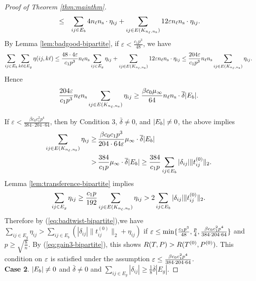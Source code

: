 \begin{proof}[Proof of Theorem \ref{thm:mainthm}]
\begin{eqnarray*}
	& \le & \sum_{ij\in E_{b}}4 n_\ell n_\text{s}\cdot\eta_{ij}+\sum_{ij\in E(K_{n_\ell, n_\text{s}})}12 \varepsilon n_\ell n_\text{s} \cdot\eta_{ij}.
\end{eqnarray*}
By Lemma \ref{lem:badgood-bipartite}, if $\varepsilon < \frac{c_1p^3}{48}$, we have
\[
	\sum_{ij\in E_{b}}\sum_{k\ell\in E_{g}}\eta(ij,k\ell)
	\le\frac{48 \cdot 4\varepsilon}{c_{1}p^{3}}n_\ell n_\text{s}\sum_{ij\in E_{g}}\eta_{ij}+\sum_{ij\in E(K_{n_\ell, n_\text{s}})} 12 \varepsilon n_\ell n_\text{s}\cdot\eta_{ij}
	\le\frac{204 \varepsilon}{c_{1}p^{3}}n_\ell n_\text{s}\sum_{ij\in E(K_{n_\ell, n_\text{s}})}\eta_{ij}.
\]
Hence
\[
	\frac{204\varepsilon}{c_{1}p^{3}}n_\ell n_\text{s}\sum_{ij\in E(K_{n_\ell, n_\text{s}})}\eta_{ij}\ge\frac{\beta c_{0}\mu_{\infty}}{64} n_\ell n_\text{s} \cdot\overline{\delta}|E_{b}|.
\]

If $\varepsilon< \frac{\beta c_0 c_1^2 p^4}{384\cdot 204 \cdot 64}$, then by Condition 3,
 $\bar{\delta} \neq 0$, and $|E_b| \neq 0$, the above implies 
\begin{align*}
	\sum_{ij\in E(K_{n_\ell, n_\text{s}})}\eta_{ij}
	\ge&\, \frac{\beta c_{0}c_{1}p^{3}}{204 \cdot 64 \varepsilon}\mu_{\infty} \cdot\overline{\delta}|E_{b}| \\
	>&\, \frac{384}{c_{1}p}\mu_{\infty}\cdot\overline{\delta}|E_{b}|
	\ge \frac{384}{c_{1}p}\sum_{ij\in E_{b}}|\delta_{ij}|\|t_{ij}^{(0)}\|_2.
\end{align*}
Lemma \ref{lem:transference-bipartite} implies 
\[
	\sum_{ij\in E_{g}}\eta_{ij}
	\ge \frac{c_{1}p}{192}\sum_{ij\in E(K_{n_\ell, n_\text{s}})}\eta_{ij}
	> 2\sum_{ij\in E_{b}}|\delta_{ij}|\|t_{ij}^{(0)}\|_2.
\]
Therefore by (\ref{eq:badtwist-bipartite}),we have $\sum_{ij\in E_{g}}\eta_{ij}>\sum_{ij\in E_{b}}(|\delta_{ij}|\|t_{ij}^{(0)}\|_2+\eta_{ij})$ if $\varepsilon \le \min\{\frac{c_1p^3}{48}, \frac{p}{4}, \frac{\beta c_0 c_1^2 p^4}{384 \cdot 204 \cdot 64} \}$ and $p \geq \sqrt{\frac{8}{n}}$.
By (\ref{eq:gain3-bipartite}), this shows $R(T,P)>R(T^{(0)}, P^{(0)})$. This condition on $\varepsilon$ is satisfied under the assumption $\varepsilon \leq \frac{\beta c_0 c_1^2 p^4}{384 \cdot 204\cdot64}$.
\\

\noindent\textbf{Case 2}. $|E_b| \neq 0$ and $\bar{\delta} \neq 0$ and $\sum_{ij\in E_{g}}|\delta_{ij}|\ge\frac{1}{8}\overline{\delta}|E_{g}|$. 
\medskip


\end{proof}
